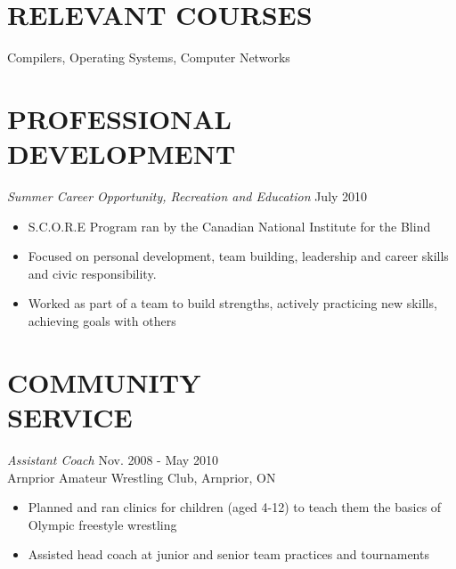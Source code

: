 \documentclass[margin]{res}
\begin{document}
\begin{resume}


\section{RELEVANT COURSES}
Compilers, Operating Systems, Computer Networks

\section{PROFESSIONAL DEVELOPMENT} {\sl Summer Career Opportunity, Recreation and Education} \hfill July 2010
\begin{itemize} \itemsep -2pt
  \item S.C.O.R.E Program ran by the Canadian National Institute for the Blind
  \item Focused on personal development, team building, leadership and career skills and civic responsibility.
  \item Worked as part of a team to build strengths, actively practicing new skills, achieving goals with others
\end{itemize}

\section{COMMUNITY \\ SERVICE}  {\sl Assistant Coach} \hfill Nov. 2008 - May 2010\\
Arnprior Amateur Wrestling Club, Arnprior, ON
\begin{itemize}\itemsep -2pt
  \item Planned and ran clinics for children (aged 4-12) to teach them the basics of Olympic freestyle wrestling
  \item Assisted head coach at junior and senior team practices and tournaments
\end{itemize}


\end{resume}
\end{document}
